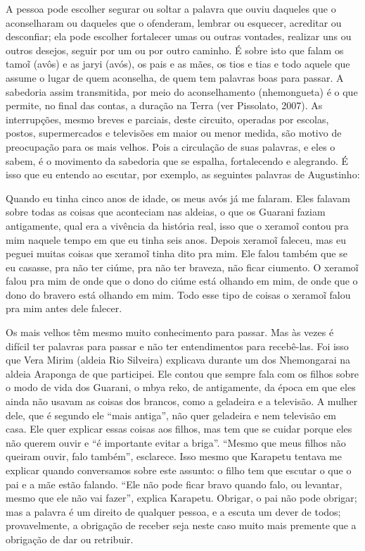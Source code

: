 \documentclass{article}
\begin{document}
A pessoa pode escolher segurar ou soltar a palavra que ouviu daqueles
que o aconselharam ou daqueles que o ofenderam, lembrar ou esquecer,
acreditar ou desconfiar; ela pode escolher fortalecer umas ou outras
vontades, realizar uns ou outros desejos, seguir por um ou por outro
caminho. \'E sobre isto que falam os tamo\~{i} (av\^os) e as jaryi
(av\'os), os pais e as m\~aes, os tios e tias e todo aquele que assume
o lugar de quem aconselha, de quem tem palavras boas para passar. A
sabedoria assim transmitida, por meio do aconselhamento (nhemongueta)
\'e o que permite, no final das contas, a dura\c{c}\~ao na Terra (ver
Pissolato, 2007). As interrup\c{c}\~oes, mesmo breves e parciais, deste
circuito, operadas por escolas, postos, supermercados e televis\~oes em
maior ou menor medida, s\~ao motivo de preocupa\c{c}\~ao para os mais
velhos. Pois a circula\c{c}\~ao de suas palavras, e eles o sabem, \'e o
movimento da sabedoria que se espalha, fortalecendo e alegrando. \'E
isso que eu entendo ao escutar, por exemplo, as seguintes palavras de
Augustinho:

Quando eu tinha cinco anos de idade, os meus av\'os j\'a me falaram.
Eles falavam sobre todas as coisas que aconteciam nas aldeias, o que os
Guarani faziam antigamente, qual era a viv\^encia da hist\'oria real,
isso que o xeramo\~{i} contou pra mim naquele tempo em que eu tinha
seis anos. Depois xeramo\~{i} faleceu, mas eu peguei muitas coisas que
xeramo\~{i} tinha dito pra mim. Ele falou tamb\'em que se eu casasse,
pra n\~ao ter ci\'ume, pra n\~ao ter braveza, n\~ao ficar ciumento. O
xeramo\~{i} falou pra mim de onde que o dono do ci\'ume est\'a olhando
em mim, de onde que o dono do bravero est\'a olhando em mim. Todo esse
tipo de coisas o xeramo\~{i} falou pra mim antes dele falecer.

Os mais velhos t\^em mesmo muito conhecimento para passar. Mas \`as
vezes \'e dif\'icil ter palavras para passar e n\~ao ter entendimentos
para receb\^e-las. Foi isso que Vera Mirim (aldeia Rio Silveira)
explicava durante um dos Nhemongarai na aldeia Araponga de que
participei. Ele contou que sempre fala com os filhos sobre o modo de
vida dos Guarani, o mbya reko, de antigamente, da \'epoca em que eles
ainda n\~ao usavam as coisas dos brancos, como a geladeira e a
televis\~ao. A mulher dele, que \'e segundo ele {\textquotedblleft}mais
antiga{\textquotedblright}, n\~ao quer geladeira e nem televis\~ao em
casa. Ele quer explicar essas coisas aos filhos, mas tem que se cuidar
porque eles n\~ao querem ouvir e {\textquotedblleft}\'e importante
evitar a briga{\textquotedblright}. {\textquotedblleft}Mesmo que meus
filhos n\~ao queiram ouvir, falo tamb\'em{\textquotedblright},
esclarece. Isso mesmo que Karapetu tentava me explicar quando
conversamos sobre este assunto: o filho tem que escutar o que o pai e a
m\~ae est\~ao falando. {\textquotedblleft}Ele n\~ao pode ficar bravo
quando falo, ou levantar, mesmo que ele n\~ao vai
fazer{\textquotedblright}, explica Karapetu. Obrigar, o pai n\~ao pode
obrigar; mas a palavra \'e um direito de qualquer pessoa, e a escuta um
dever de todos; provavelmente, a obriga\c{c}\~ao de receber seja neste
caso muito mais premente que a obriga\c{c}\~ao de dar ou retribuir. 
\end{document}
